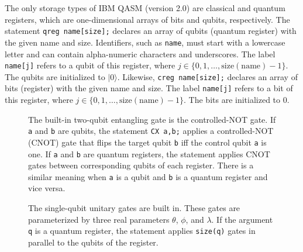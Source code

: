 \documentclass[USenglish,12pt,fleqn]{article} %
\newcommand*{\code}{\texttt}
\begin{document}
The only storage types of IBM QASM (version 2.0) are classical and quantum registers, which are one-dimensional arrays of bits and qubits, respectively. The statement \code{qreg name[size];} declares an array of qubits (quantum register) with the given name and size. Identifiers, such as \code{name}, must start with a lowercase letter and can contain alpha-numeric characters and underscores. The label \code{name[j]} refers to a qubit of this register, where $j\in \{0,1,\dots,\mathrm{size}(\mathrm{name})-1\}$. The qubits are initialized to $|0\rangle$. Likewise, \code{creg name[size];} declares an array of bits (register) with the given name and size. The label \code{name[j]} refers to a bit of this register, where $j\in \{0,1,\dots,\mathrm{size}(\mathrm{name})-1\}$. The bits are initialized to $0$.

\begin{figure}
\begin{minipage}{.2\textwidth}

\end{minipage}
\begin{minipage}{.2\textwidth}

\end{minipage}
\begin{minipage}{.2\textwidth}

\end{minipage}
\begin{minipage}{.2\textwidth}

\end{minipage}
\caption{The built-in two-qubit entangling gate is the controlled-NOT gate. If \code{a} and \code{b} are qubits, the statement \code{CX a,b;} applies a controlled-NOT (CNOT) gate that flips the target qubit \code{b} iff the control qubit \code{a} is one. If \code{a} and \code{b} are quantum registers, the statement applies CNOT gates between corresponding qubits of each register. There is a similar meaning when \code{a} is a qubit and \code{b} is a quantum register and vice versa.
\label{fig:cnot}}
\end{figure}

\begin{figure}
\hspace{.2\textwidth}
\begin{minipage}{.2\textwidth}

\end{minipage}
\hspace{.1\textwidth}
\begin{minipage}{.2\textwidth}

\end{minipage}
\caption{The single-qubit unitary gates are built in. These gates are parameterized by three real parameters $\theta$, $\phi$, and $\lambda$. If the argument \code{q} is a quantum register, the statement applies \code{size(q)} gates in parallel to the qubits of the register.\label{fig:utpl}}
\end{figure}
\end{document}
